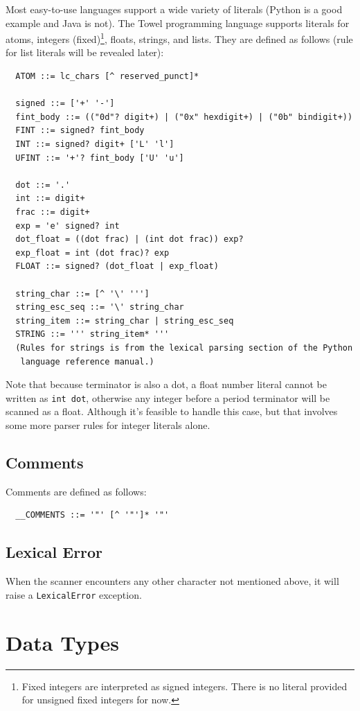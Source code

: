 \documentclass{book}
\begin{document}
Most easy-to-use languages support a wide variety of literals (Python is a good example and Java is not). The Towel programming language supports literals for atoms, integers (fixed)\footnote{Fixed integers are interpreted as signed integers. There is no literal provided for unsigned fixed integers for now.}, floats, strings, and lists. They are defined as follows (rule for list literals will be revealed later):
\begin{verbatim}
  ATOM ::= lc_chars [^ reserved_punct]*

  signed ::= ['+' '-']
  fint_body ::= (("0d"? digit+) | ("0x" hexdigit+) | ("0b" bindigit+))
  FINT ::= signed? fint_body
  INT ::= signed? digit+ ['L' 'l']
  UFINT ::= '+'? fint_body ['U' 'u']

  dot ::= '.'
  int ::= digit+
  frac ::= digit+
  exp = 'e' signed? int
  dot_float = ((dot frac) | (int dot frac)) exp?
  exp_float = int (dot frac)? exp
  FLOAT ::= signed? (dot_float | exp_float)

  string_char ::= [^ '\' ''']
  string_esc_seq ::= '\' string_char
  string_item ::= string_char | string_esc_seq
  STRING ::= ''' string_item* '''
  (Rules for strings is from the lexical parsing section of the Python
   language reference manual.)
\end{verbatim}

Note that because terminator is also a dot, a float number literal cannot be written as \texttt{int dot}, otherwise any integer before a period terminator will be scanned as a float. Although it's feasible to handle this case, but that involves some more parser rules for integer literals alone.

\section{Comments}

Comments are defined as follows:
\begin{verbatim}
  __COMMENTS ::= '"' [^ '"']* '"'
\end{verbatim}

\section{Lexical Error}

When the scanner encounters any other character not mentioned above, it will raise a \texttt{LexicalError} exception.

\chapter{Data Types}
\label{chap:data-types}
\end{document}
